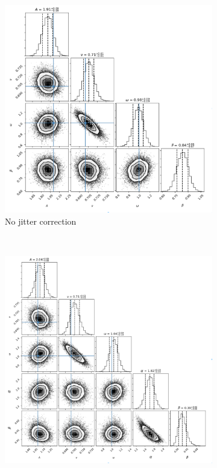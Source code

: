 \begin{figure}[tbp]	
    \begin{subfigure}[b]{0.49\textwidth}
        \includegraphics[width=\textwidth]{./Figures/Methods/Fitting_3-MCMC2.png}
        \caption{No jitter correction}
    \end{subfigure}
	~
    \begin{subfigure}[b]{0.49\textwidth}
        \includegraphics[width=\textwidth]{./Figures/Methods/Fitting_3-MCMC1_XY.png}

\end{subfigure}
\end{figure}
